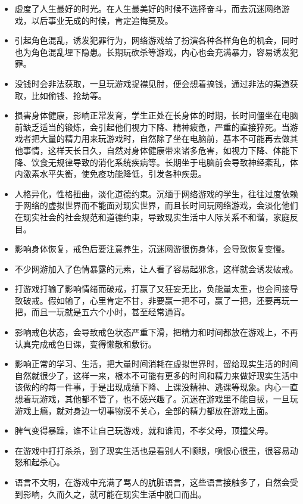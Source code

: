 \begin{multicols}{2}
\begin{itemize}
        \item 虚度了人生最好的时光。在人生最美好的时候不选择奋斗，而去沉迷网络游戏，以后事业无成的时候，肯定追悔莫及。
        \item 引起角色混乱，诱发犯罪行为，网络游戏给了扮演各种各样角色的机会，同时也为角色混乱埋下隐患。长期玩砍杀等游戏，内心也会充满暴力，容易诱发犯罪。
        \item 没钱时会非法获取，一旦玩游戏捉襟见肘，便会想着搞钱，通过非法的渠道获取，比如偷钱、抢劫等。
        \item 损害身体健康，影响正常发育，学生正处在长身体的时期，长时间僵坐在电脑前缺乏适当的锻炼，会引起他们视力下降、精神疲惫，严重的直接猝死。当游戏者把大量的精力用来玩游戏时，自然除了坐在电脑前，基本不可能再去做其他事情，这样天长日久，自然对身体健康带来诸多危害，如视力下降、体能下降、饮食无规律导致的消化系统疾病等。长期坐于电脑前会导致神经紊乱，体内激素水平失衡，使免疫功能降低，引发各种疾患。
        \item 人格异化，性格扭曲，淡化道德约束。沉缅于网络游戏的学生，往往过度依赖于网络的虚拟世界而不能面对现实世界，而且长时间玩网络游戏，会淡化他们在现实社会的社会规范和道德约束，导致现实生活中人际关系不和谐，家庭反目。
        \item 影响身体恢复，戒色后要注意养生，沉迷网游很伤身体，会导致恢复变慢。
        \item 不少网游加入了色情暴露的元素，让人看了容易起邪念，这样就会诱发破戒。
        \item 打游戏打输了影响情绪而破戒，打赢了又狂妄无比，负能量太重，也会间接导致破戒。假如输了，心里肯定不甘，非要赢一把不可，赢了一把，还要再玩一把，而且一玩就是五六个小时，甚至经常通宵。
        \item 影响戒色状态，会导致戒色状态严重下滑，把精力和时间都放在游戏上，不再认真完成戒色日课，变得懒散和敷衍。
        \item 影响正常的学习、生活，把大量时间消耗在虚拟世界时，留给现实生活的时间自然就很少了，这样一来，根本不可能有更多的时间和精力来做好现实生活中该做的的每一件事，于是出现成绩下降、上课没精神、逃课等现象。内心一直想着玩游戏，其他都不管了，也不感兴趣了。沉迷在游戏里不能自拔，一旦玩游戏上瘾，就对身边一切事物漠不关心，全部的精力都放在游戏上面。
        \item 脾气变得暴躁，谁不让自己玩游戏，就和谁闹，不孝父母，顶撞父母。
        \item 在游戏中打打杀杀，到了现实生活也是看别人不顺眼，嗔恨心很重，很容易动怒和起杀心。
        \item 语言不文明，在游戏中充满了骂人的肮脏语言，这些语言接触多了，自然会受到影响，久而久之，就可能在现实生活中脱口而出。

\end{itemize}
\end{multicols}

